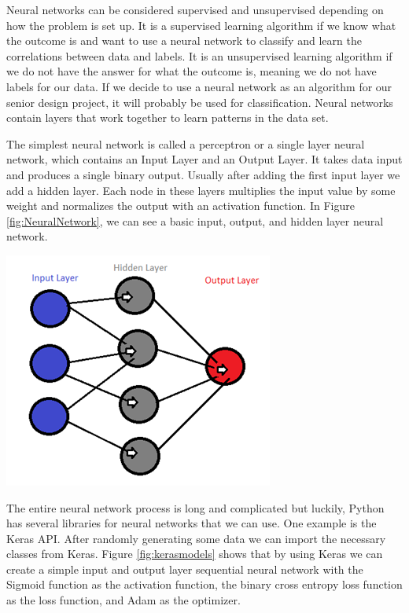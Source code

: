 \documentclass[a4paper,12pt]{report}
\begin{document}
Neural networks can be considered supervised and unsupervised depending on how the problem is set up. It is a supervised learning algorithm if we know what the outcome is and want to use a neural network to classify and learn the correlations between data and labels. It is an unsupervised learning algorithm if we do not have the answer for what the outcome is, meaning we do not have labels for our data. If we decide to use a neural network as an algorithm for our senior design project, it will probably be used for classification. Neural networks contain layers that work together to learn patterns in the data set.

The simplest neural network is called a perceptron or a single layer neural network, which contains an Input Layer and an Output Layer. It takes data input and produces a single binary output. Usually after adding the first input layer we add a hidden layer. Each node in these layers multiplies the input value by some weight and normalizes the output with an activation function. In Figure \ref{fig:NeuralNetwork}, we can see a basic input, output, and hidden layer neural network. 

\begin{center}
    \captionsetup{type=figure}
    \includegraphics[width=.6\linewidth]{media/NeuralNetwork.png}
    \label{fig:NeuralNetwork}
\end{center}

The entire neural network process is long and complicated but luckily, Python has several libraries for neural networks that we can use. One example is the Keras API. After randomly generating some data we can import the necessary classes from Keras. Figure \ref{fig:kerasmodels} shows that by using Keras we can create a simple input and output layer sequential neural network with the Sigmoid function as the activation function, the binary cross entropy loss function as the loss function, and Adam as the optimizer.
\end{document}
